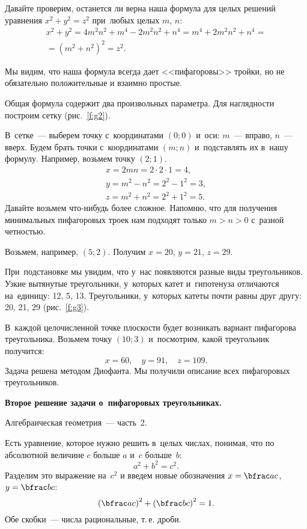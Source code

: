 Давайте проверим, останется ли верна наша формула для целых решений уравнения $x^{2}+y^{2}=z^{2}$ при~любых целых $m$, $n$:
\begin{multline*}
x^{2}+y^{2} =
4m^{2}n^{2}+m^{4}-2m^{2}n^{2}+n^{4}=
m^{4}+2m^{2}n^{2}+n^{4}=
\\=
(m^{2}+n^{2})^{2}=
z^{2}.
\end{multline*}

Мы видим, что наша формула всегда дает <<пифагоровы>> тройки, но не обязательно положительные и взаимно простые.

Общая формула содержит два произвольных параметра.
Для наглядности построим сетку (рис.~\ref{f:g2}).



В~сетке~--- выберем точку с~координатами $(0;0)$ и~оси: $m$~--- вправо, $n$~--- вверх.
Будем брать точки с~координатами $(m;n)$ и~подставлять их в~нашу формулу. Например, возьмем точку $(2;1)$.
\begin{gather*}
x=2mn=2\cdot2\cdot1=4,\\
y=m^{2}-n^{2}=2^{2}-1^{2}=3,\\
z=m^{2}+n^{2} =2^{2}+1^{2}=5.
\end{gather*}
Давайте возьмем что-нибудь более сложное. Напомню, что для получения минимальных пифагоровых троек нам подходят только $m>n>0$ с~разной четностью.

Возьмем, например, $(5;2)$. Получим $x=20$, $y=21$, $z=29$.

При~подстановке мы увидим, что у~нас появляются разные виды треугольников. Узкие вытянутые
треугольники, у~которых катет и~гипотенуза отличаются на~единицу: 12, 5, 13. Треугольники, у~которых
катеты почти равны друг другу: 20, 21, 29 (рис.~\ref{f:g3}).


В~каждой целочисленной точке плоскости будет возникать вариант
пифагорова треугольника. Возьмем точку $(10;3)$ и~посмотрим, какой треугольник получится:
$$
x=60,\quad
y=91,\quad
z=109.
$$
Задача решена методом Диофанта. Мы получили описание всех пифагоровых треугольников.

\textbf{Второе решение задачи о~пифагоровых треугольниках.}

Алгебраическая геометрия~--- часть~2.

Есть уравнение, которое нужно решить в~целых числах, понимая, что по абсолютной величине $c$ больше $a$ и~$c$ больше~$b$:
$$
a^{2}+b^{2}=c^{2}.
$$
Разделим это выражение на~$c^{2}$ и введем новые обозначения $x=\bfrac ac$, $y=\bfrac bc$:
$$
\left(\bfrac ac\right)^{2}+\left(\bfrac bc\right)^{2}=1.
$$
Обе скобки~--- числа рациональные, т.\,е. дроби.

